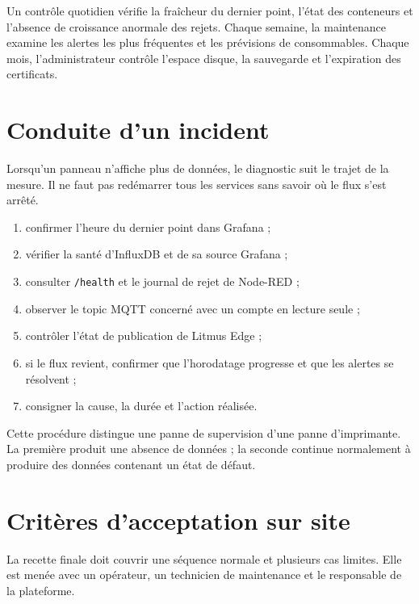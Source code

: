 Un contrôle quotidien vérifie la fraîcheur du dernier point, l'état des
conteneurs et l'absence de croissance anormale des rejets. Chaque semaine, la
maintenance examine les alertes les plus fréquentes et les prévisions de
consommables. Chaque mois, l'administrateur contrôle l'espace disque, la
sauvegarde et l'expiration des certificats.

\section{Conduite d'un incident}

Lorsqu'un panneau n'affiche plus de données, le diagnostic suit le trajet de la
mesure. Il ne faut pas redémarrer tous les services sans savoir où le flux s'est
arrêté.

\begin{enumerate}
  \item confirmer l'heure du dernier point dans Grafana ;
  \item vérifier la santé d'InfluxDB et de sa source Grafana ;
  \item consulter \texttt{/health} et le journal de rejet de Node-RED ;
  \item observer le topic MQTT concerné avec un compte en lecture seule ;
  \item contrôler l'état de publication de Litmus Edge ;
  \item si le flux revient, confirmer que l'horodatage progresse et que les
        alertes se résolvent ;
  \item consigner la cause, la durée et l'action réalisée.
\end{enumerate}

Cette procédure distingue une panne de supervision d'une panne d'imprimante.
La première produit une absence de données ; la seconde continue normalement
à produire des données contenant un état de défaut.

\section{Critères d'acceptation sur site}

La recette finale doit couvrir une séquence normale et plusieurs cas limites.
Elle est menée avec un opérateur, un technicien de maintenance et le
responsable de la plateforme.

